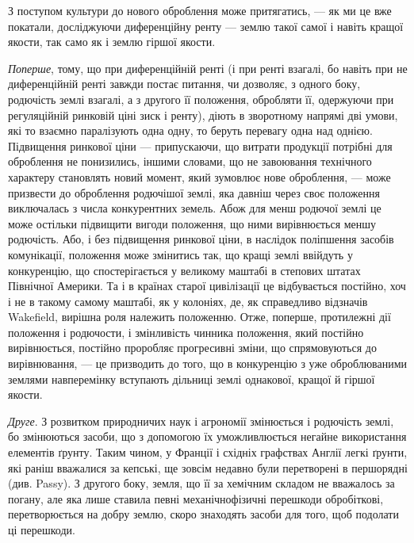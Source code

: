 
З поступом культури до нового оброблення може притягатись, — як ми це
вже покатали, досліджуючи диференційну ренту — землю такої самої і навіть
кращої якости, так само як і землю гіршої якости.

\emph{Поперше}, тому, що при диференційній ренті (і при ренті взагалі, бо
навіть при не диференційній ренті завжди постає питання, чи дозволяє, з одного
боку, родючість землі взагалі, а з другого її положення, обробляти її,
одержуючи при регуляційній ринковій ціні зиск і ренту), діють в зворотному
напрямі дві умови, які то взаємно паралізують одна одну, то беруть
перевагу одна над однією. Підвищення ринкової ціни — припускаючи, що витрати
продукції потрібні для оброблення не понизились, іншими словами, що
не завоювання технічного характеру становлять новий момент, який зумовлює
нове оброблення, — може призвести до оброблення родючішої землі, яка давніш
через своє положення виключалась з числа конкурентних земель. Абож для
менш родючої землі це може остільки підвищити вигоди положення, що ними
вирівнюється меншу родючість. Або, і без підвищення ринкової ціни, в наслідок
поліпшення засобів комунікації, положення може змінитись так, що кращі землі
ввійдуть у конкуренцію, що спостерігається у великому маштабі в степових
штатах Північної Америки. Та і в країнах старої цивілізації це відбувається
постійно, хоч і не в такому самому маштабі, як у колоніях, де, як справедливо
відзначів Wakefield, вирішна роля належить положенню. Отже, поперше,
протилежні дії положення і родючости, і змінливість чинника положення, який
постійно вирівнюється, постійно проробляє прогресивні зміни, що спрямовуються
до вирівнювання, — це призводить до того, що в конкуренцію з уже оброблюваними
землями навперемінку вступають дільниці землі однакової, кращої й
гіршої якости.

\emph{Друге}. З розвитком природничих наук і агрономії змінюється і родючість
землі, бо змінюються засоби, що з допомогою їх уможливлюється негайне
використання елементів ґрунту. Таким чином, у Франції і східніх графствах
Англії легкі ґрунти, які раніш вважалися за кепські, ще зовсім недавно були
перетворені в першорядні (див. Passy). З другого боку, земля, що її за хемічним
складом не вважалось за погану, але яка лише ставила певні механічнофізичні
перешкоди обробіткові, перетворюється на добру землю, скоро знаходять
засоби для того, щоб подолати ці перешкоди.

